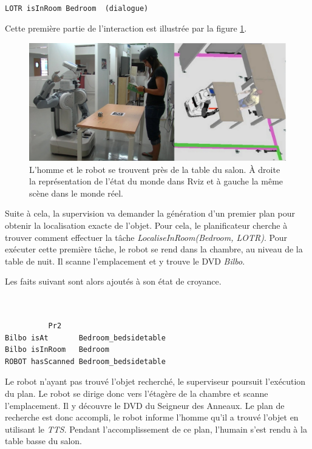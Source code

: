 \documentclass[a4paper,11pt,twoside]{StyleThese}
\begin{document}
\begin{scriptsize}
\begin{verbatim}

LOTR isInRoom Bedroom  (dialogue)

\end{verbatim}
\end{scriptsize}


Cette première partie de l'interaction est illustrée par la figure \ref{fig:mardiDemo1}.

\begin{figure}[ht!]
 \centering
  \includegraphics[width=0.99\linewidth]{./img/mardiDemo1b.jpg}
  \caption {L'homme et le robot se trouvent près de la table du salon. À droite la représentation de l'état du monde dans Rviz et à gauche la même scène dans le monde réel.}
  \label{fig:mardiDemo1}
\end{figure}

Suite à cela, la supervision va demander la génération d'un premier plan pour obtenir la localisation exacte de l'objet. Pour cela, le planificateur cherche à trouver comment effectuer la tâche \textit{LocaliseInRoom(Bedroom, LOTR)}.
Pour exécuter cette première tâche, le robot se rend dans la chambre, au niveau de la table de nuit. Il scanne l'emplacement et y trouve le DVD \textit{Bilbo}.

Les faits suivant sont alors ajoutés à son état de croyance.

\begin{scriptsize}
\begin{verbatim}


          Pr2
Bilbo isAt       Bedroom_bedsidetable
Bilbo isInRoom   Bedroom
ROBOT hasScanned Bedroom_bedsidetable

\end{verbatim}
\end{scriptsize}

Le robot n'ayant pas trouvé l'objet recherché, le superviseur poursuit l'exécution du plan. Le robot se dirige donc vers l'étagère de la chambre et scanne l'emplacement.
Il y découvre le DVD du Seigneur des Anneaux.
Le plan de recherche est donc accompli, le robot informe l'homme qu'il a trouvé l'objet en utilisant le \textit{TTS}.
Pendant l'accomplissement de ce plan, l'humain s'est rendu à la table basse du salon.
\end{document}

